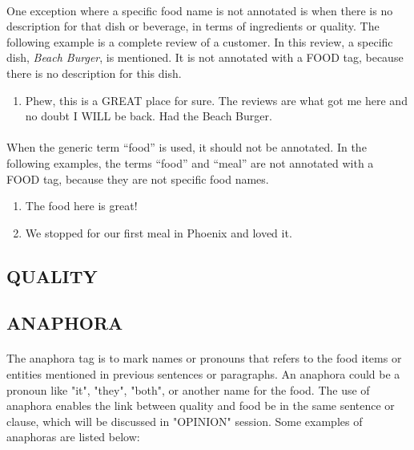 \documentclass{article}
\begin{document}
\paragraph{}
One exception where a specific food name is not annotated is when there is no description for that dish or beverage, in terms of ingredients or quality. The following example is a complete review of a customer. In this review, a specific dish, \textit{Beach Burger}, is mentioned. It is not annotated with a FOOD tag, because there is no description for this dish.

\begin{enumerate}[resume]
\item Phew, this is a GREAT place for sure. The reviews are what got me here and no doubt I WILL be back. Had the Beach Burger.
\end{enumerate}

\paragraph{}
When the generic term ``food'' is used, it should not be annotated. In the following examples, the terms ``food'' and ``meal'' are not annotated with a FOOD tag, because they are not specific food names. 
\begin{enumerate}[resume]
\item The food here is great!
\item We stopped for our first meal in Phoenix and loved it.
\end{enumerate}


\subsection{QUALITY}
\paragraph{}


\subsection{ANAPHORA}
\paragraph{}
The anaphora tag is to mark names or pronouns that refers to the food items or entities mentioned in previous sentences or paragraphs. An anaphora could be a pronoun like "it", "they", "both", or another name for the food. The use of anaphora enables the link between quality and food be in the same sentence or clause, which will be discussed in "OPINION" session. Some examples of anaphoras are listed below:
\end{document}
